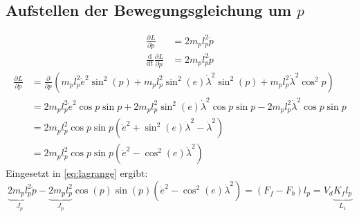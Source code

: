 \documentclass{article}
\newcommand{\partiell}[3][]{\frac{\partial^{#1}#2}{\partial{#3}^{#1}}}
\newcommand{\diff}[3][]{\frac{\mathrm{d}^{#1}#2}{\mathrm{d}{#3}^{#1}}}
\begin{document}
\subsection{Aufstellen der Bewegungsgleichung um $p$}
\begin{align}
\partiell{L}{\dot{p}} &= 2m_p l_p^2 \dot{p}\\
\diff{}{t} \partiell{L}{\dot{p}} &= 2m_p l_p^2 \ddot{p}
\end{align}
\begin{equation}
\begin{split}
\partiell{L}{p} &= \partiell{}{p} (m_p l_p^2 \dot{e}^2 \sin^2 (p) 
+ m_p l_p^2 \sin^2 (e) \dot{\lambda}^2 \sin^2 (p)
+ m_p l_p^2 \dot{\lambda}^2 \cos^2 p)\\
&= 2 m_p l_p^2 \dot{e}^2 \cos p \sin p + 2 m_p l_p^2 \sin^2 (e) \dot{\lambda}^2 \cos p \sin p 
- 2 m_p l_p^2 \dot{\lambda}^2 \cos p \sin p\\
&= 2 m_p l_p^2 \cos p \sin p (\dot{e}^2+ \sin^2 (e) \dot{\lambda}^2- \dot{\lambda}^2)\\
&= 2 m_p l_p^2 \cos p \sin p (\dot{e}^2- \cos^2 (e) \dot{\lambda}^2)
\end{split}
\end{equation}
Eingesetzt in \eqref{eq:lagrange} ergibt:
\begin{equation}
\underbrace{2m_p l_p^2}_{J_p} \ddot{p} -  \underbrace{2 m_p l_p^2}_{J_p} \cos (p) \sin (p) (\dot{e}^2- \cos^2 (e) \dot{\lambda}^2) = (F_f - F_b)l_p = V_d \underbrace{K_f l_p}_{L_1}
\end{equation}
\end{document}
